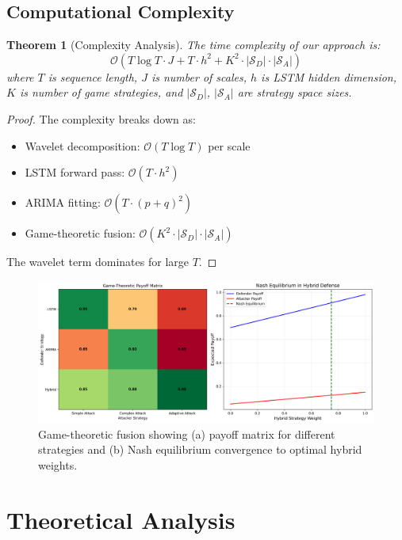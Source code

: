 \documentclass[10pt,conference]{IEEEtran}
\newtheorem{theorem}{Theorem}
\begin{document}
\subsection{Computational Complexity}

\begin{theorem}[Complexity Analysis]
The time complexity of our approach is:
\begin{equation}
\mathcal{O}(T \log T \cdot J + T \cdot h^2 + K^2 \cdot |\mathcal{S}_D| \cdot |\mathcal{S}_A|)
\end{equation}
where $T$ is sequence length, $J$ is number of scales, $h$ is LSTM hidden dimension, $K$ is number of game strategies, and $|\mathcal{S}_D|$, $|\mathcal{S}_A|$ are strategy space sizes.
\end{theorem}

\begin{proof}
The complexity breaks down as:
\begin{itemize}
\item Wavelet decomposition: $\mathcal{O}(T \log T)$ per scale
\item LSTM forward pass: $\mathcal{O}(T \cdot h^2)$
\item ARIMA fitting: $\mathcal{O}(T \cdot (p+q)^2)$
\item Game-theoretic fusion: $\mathcal{O}(K^2 \cdot |\mathcal{S}_D| \cdot |\mathcal{S}_A|)$
\end{itemize}
The wavelet term dominates for large $T$.
\end{proof}

\begin{figure}[!t]
\centering
\includegraphics[width=\columnwidth]{figures/game_theory_fusion.png}
\caption{Game-theoretic fusion showing (a) payoff matrix for different strategies and (b) Nash equilibrium convergence to optimal hybrid weights.}
\label{fig:gametheory}
\end{figure}

\section{Theoretical Analysis}
\end{document}
